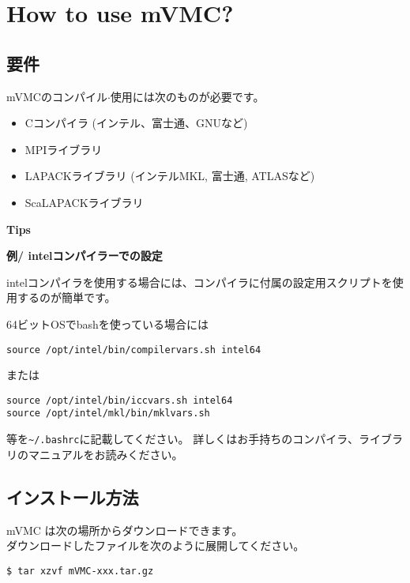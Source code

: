 \chapter{How to use mVMC?}
\label{Ch:HowTo}

\section{要件}

mVMCのコンパイル$\cdot$使用には次のものが必要です。
\begin{itemize}
\item Cコンパイラ (インテル、富士通、GNUなど)
\item MPIライブラリ
\item LAPACKライブラリ (インテルMKL, 富士通, ATLASなど)
\item ScaLAPACKライブラリ
\end{itemize}

\begin{screen}
\Large 
{\bf Tips}
\normalsize

{\bf 例/ intelコンパイラーでの設定}

intelコンパイラを使用する場合には、コンパイラに付属の設定用スクリプトを使用するのが簡単です。

64ビットOSでbashを使っている場合には
\begin{verbatim}
source /opt/intel/bin/compilervars.sh intel64
\end{verbatim}
または
\begin{verbatim}
source /opt/intel/bin/iccvars.sh intel64
source /opt/intel/mkl/bin/mklvars.sh
\end{verbatim}
等を\verb|~/.bashrc|に記載してください。
詳しくはお手持ちのコンパイラ、ライブラリのマニュアルをお読みください。

\end{screen}

\section{インストール方法}

mVMC は次の場所からダウンロードできます。\\

ダウンロードしたファイルを次のように展開してください。
\begin{verbatim}
$ tar xzvf mVMC-xxx.tar.gz
\end{verbatim}

